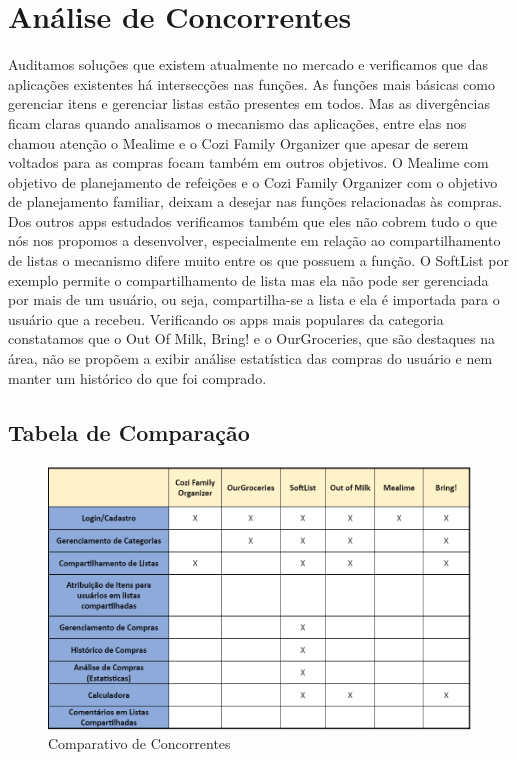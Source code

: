 \chapter{Análise de Concorrentes}
Auditamos soluções que existem atualmente no mercado e verificamos que das aplicações existentes há intersecções nas funções. As funções mais básicas como gerenciar itens e gerenciar listas estão presentes em todos. Mas as divergências ficam claras quando analisamos o mecanismo das aplicações, entre elas nos chamou atenção o Mealime e o Cozi Family Organizer que apesar de serem voltados para as compras focam também em outros objetivos. O Mealime com objetivo de planejamento de refeições e o Cozi Family Organizer com o objetivo de planejamento familiar, deixam a desejar nas funções relacionadas às compras.
Dos outros apps estudados verificamos também que eles não cobrem tudo o que nós nos propomos a desenvolver, especialmente em relação ao compartilhamento de listas o mecanismo difere muito entre os que possuem a função. O SoftList por exemplo permite o compartilhamento de lista mas ela não pode ser gerenciada por mais de um usuário, ou seja, compartilha-se a lista e ela é importada para o usuário que a recebeu. 
Verificando os apps mais populares da categoria constatamos que o Out Of Milk, Bring! e o OurGroceries, que são destaques na área, não se propõem a exibir análise estatística das compras do usuário e nem manter um histórico do que foi comprado.


\section{Tabela de Comparação}

	\begin{figure}[h!]
	\centering
	\includegraphics[width=.8\textwidth,height=\textheight,keepaspectratio]{./imagens/tabela_comparativa.png} 
	\caption{Comparativo de Concorrentes}
	\end{figure}
	